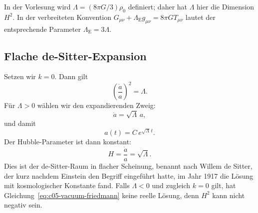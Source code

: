 \begin{remark}
In der Vorlesung wird \(\Lambda=(8\pi G/3)\rho_0\) definiert; daher hat \(\Lambda\) hier die Dimension \(H^2\). In der verbreiteten Konvention \(G_{\mu\nu}+\Lambda_{\mathrm E}g_{\mu\nu}=8\pi G T_{\mu\nu}\) lautet der entsprechende Parameter \(\Lambda_{\mathrm E}=3\Lambda\).
\end{remark}

\subsection{Flache de-Sitter-Expansion}

Setzen wir \(k=0\). Dann gilt
\begin{equation}
\left(\frac{\dot a}{a}\right)^2=\Lambda.
\end{equation}
Für \(\Lambda>0\) wählen wir den expandierenden Zweig:
\begin{equation}
\dot a=\sqrt{\Lambda}\,a,
\end{equation}
und damit
\begin{equation}
a(t)=C\,e^{\sqrt{\Lambda}\,t}.
\end{equation}
Der Hubble-Parameter ist dann konstant:
\begin{equation}
H=\frac{\dot a}{a}=\sqrt{\Lambda}.
\end{equation}
Dies ist der de-Sitter-Raum in flacher Scheinung, benannt nach Willem de Sitter, der kurz nachdem Einstein den Begriff eingeführt hatte, im Jahr 1917 die Lösung mit kosmologischer Konstante fand. Falls \(\Lambda<0\) und zugleich \(k=0\) gilt, hat Gleichung~\eqref{eq:c05-vacuum-friedmann} keine reelle Lösung, denn \(H^2\) kann nicht negativ sein.

\begin{classroomqa}
\end{classroomqa}

